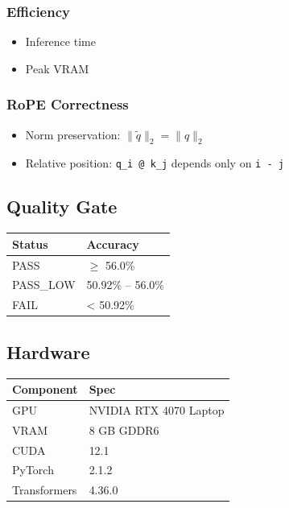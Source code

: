\subsubsection{Efficiency}
\begin{itemize}
\item Inference time
\item Peak VRAM

\end{itemize}
\subsubsection{RoPE Correctness}
\begin{itemize}
\item Norm preservation: $\|\tilde{q}\|_2 = \|q\|_2$
\item Relative position: \texttt{q\_i @ k\_j} depends only on \texttt{i - j}

\end{itemize}
\subsection{Quality Gate}

\begin{table}[H]
\centering
\small
\begin{tabular}{ll}
\toprule
\textbf{Status} & \textbf{Accuracy} \\
\midrule
PASS & $\ge$ 56.0\% \\
PASS\_LOW & 50.92\% -- 56.0\% \\
FAIL & \textless{} 50.92\% \\
\bottomrule
\end{tabular}
\end{table}

\subsection{Hardware}

\begin{table}[H]
\centering
\small
\begin{tabular}{ll}
\toprule
\textbf{Component} & \textbf{Spec} \\
\midrule
GPU & NVIDIA RTX 4070 Laptop \\
VRAM & 8 GB GDDR6 \\
CUDA & 12.1 \\
PyTorch & 2.1.2 \\
Transformers & 4.36.0 \\
\bottomrule
\end{tabular}
\end{table}

